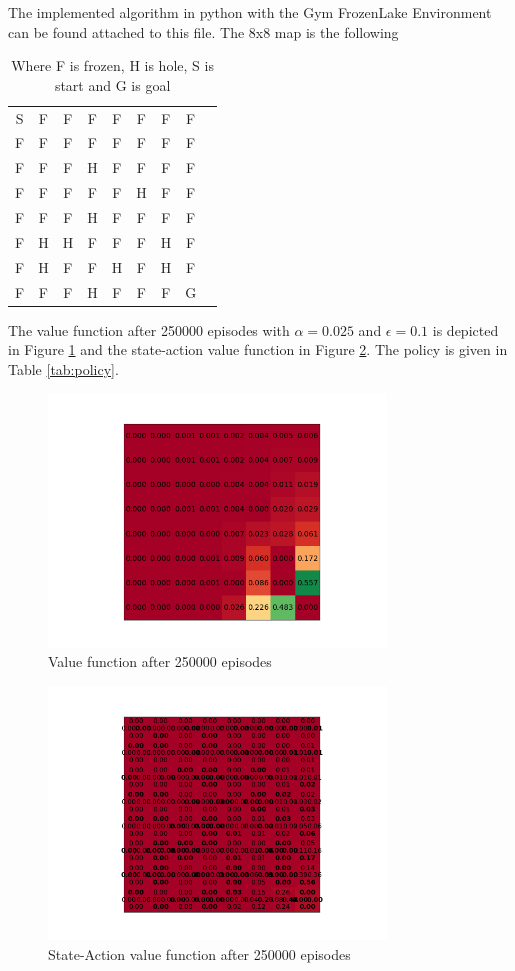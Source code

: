 \documentclass{article}
\begin{document}
The implemented algorithm in python with the Gym FrozenLake Environment can be found attached to this file. The 8x8 map is the following
\begin{table}[H]
\centering
\begin{tabular}{ccccccccc}
S&F&F&F&F&F&F&F\\
F&F&F&F&F&F&F&F\\
F&F&F&H&F&F&F&F\\
F&F&F&F&F&H&F&F\\
F&F&F&H&F&F&F&F\\
F&H&H&F&F&F&H&F\\
F&H&F&F&H&F&H&F\\
F&F&F&H&F&F&F&G
\end{tabular}
\caption{Where F is frozen, H is hole, S is start and G is goal}
\label{tab:map}
\end{table}

The value function after 250000 episodes with $\alpha = 0.025$ and $\epsilon = 0.1$ is depicted in Figure \ref{fig:V} and the state-action value function in Figure \ref{fig:Q}. The policy is given in Table \ref{tab:policy}.

\begin{figure}[H]
\centering
\includegraphics[width=0.8\textwidth]{images/V.png}
\caption{Value function after 250000 episodes}      
\label{fig:V}
\end{figure}

\begin{figure}[H]
\centering
\includegraphics[width=0.8\textwidth]{images/Q.png}
\caption{State-Action value function after 250000 episodes}
\label{fig:Q}
\end{figure}
\end{document}
